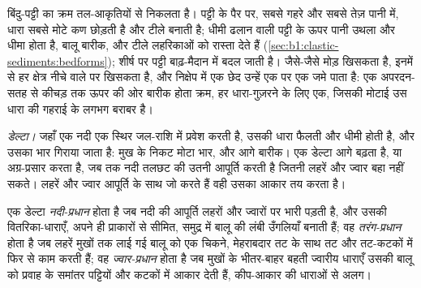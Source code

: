 बिंदु-पट्टी का क्रम तल-आकृतियों से निकलता है। पट्टी के पैर पर, सबसे गहरे और सबसे तेज़ पानी में, धारा सबसे मोटे कण छोड़ती है और टीले बनाती है; धीमी ढलान वाली पट्टी के ऊपर पानी उथला और धीमा होता है, बालू बारीक, और टीले लहरिकाओं को रास्ता देते हैं (\cref{sec:b1:clastic-sediments:bedforms}); शीर्ष पर पट्टी बाढ़-मैदान में बदल जाती है। जैसे-जैसे मोड़ खिसकता है, इनमें से हर क्षेत्र नीचे वाले पर खिसकता है, और निक्षेप में एक छेद उन्हें एक पर एक जमे पाता है: एक अपरदन-सतह से कीचड़ तक ऊपर की ओर बारीक होता क्रम, हर धारा-गुज़रने के लिए एक, जिसकी मोटाई उस धारा की गहराई के लगभग बराबर है।

\emph{डेल्टा।} जहाँ एक नदी एक स्थिर जल-राशि में प्रवेश करती है, उसकी धारा फैलती और धीमी होती है, और उसका भार गिराया जाता है: मुख के निकट मोटा भार, और आगे बारीक। एक डेल्टा आगे बढ़ता है, या अग्र-प्रसार करता है, जब तक नदी तलछट की उतनी आपूर्ति करती है जितनी लहरें और ज्वार बहा नहीं सकते। लहरें और ज्वार आपूर्ति के साथ जो करते हैं वही उसका आकार तय करता है।

\begin{definition}[नदी-प्रधान, तरंग-प्रधान और ज्वार-प्रधान डेल्टा]\label{def:b1:clastic-sediments:delta}
एक डेल्टा \emph{नदी-प्रधान} होता है जब नदी की आपूर्ति लहरों और ज्वारों पर भारी पड़ती है, और उसकी वितरिका-धाराएँ, अपने ही प्राकारों से सीमित, समुद्र में बालू की लंबी उँगलियाँ बनाती हैं; वह \emph{तरंग-प्रधान} होता है जब लहरें मुखों तक लाई गई बालू को एक चिकने, मेहराबदार तट के साथ तट और तट-कटकों में फिर से काम करती हैं; वह \emph{ज्वार-प्रधान} होता है जब मुखों के भीतर-बाहर बहती ज्वारीय धाराएँ उसकी बालू को प्रवाह के समांतर पट्टियों और कटकों में आकार देती हैं, कीप-आकार की धाराओं से अलग।
\end{definition}


